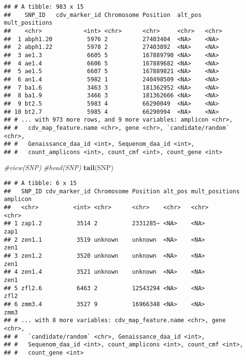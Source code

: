 \documentclass[]{article}
\newenvironment{Shaded}{\begin{snugshade}}{\end{snugshade}}
\newcommand{\KeywordTok}[1]{\textcolor[rgb]{0.13,0.29,0.53}{\textbf{#1}}}
\newcommand{\CommentTok}[1]{\textcolor[rgb]{0.56,0.35,0.01}{\textit{#1}}}
\newcommand{\NormalTok}[1]{#1}
\begin{document}
\begin{verbatim}
## # A tibble: 983 x 15
##    SNP_ID   cdv_marker_id Chromosome Position  alt_pos mult_positions
##    <chr>            <int> <chr>      <chr>     <chr>   <chr>         
##  1 abph1.20          5976 2          27403404  <NA>    <NA>          
##  2 abph1.22          5978 2          27403892  <NA>    <NA>          
##  3 ae1.3             6605 5          167889790 <NA>    <NA>          
##  4 ae1.4             6606 5          167889682 <NA>    <NA>          
##  5 ae1.5             6607 5          167889821 <NA>    <NA>          
##  6 an1.4             5982 1          240498509 <NA>    <NA>          
##  7 ba1.6             3463 3          181362952 <NA>    <NA>          
##  8 ba1.9             3466 3          181362666 <NA>    <NA>          
##  9 bt2.5             5983 4          66290049  <NA>    <NA>          
## 10 bt2.7             5985 4          66290994  <NA>    <NA>          
## # ... with 973 more rows, and 9 more variables: amplicon <chr>,
## #   cdv_map_feature.name <chr>, gene <chr>, `candidate/random` <chr>,
## #   Genaissance_daa_id <int>, Sequenom_daa_id <int>,
## #   count_amplicons <int>, count_cmf <int>, count_gene <int>
\end{verbatim}

\begin{Shaded}
\begin{Highlighting}[]
\CommentTok{#view(SNP)}
\CommentTok{#head(SNP)}
\KeywordTok{tail}\NormalTok{(SNP)}
\end{Highlighting}
\end{Shaded}

\begin{verbatim}
## # A tibble: 6 x 15
##   SNP_ID cdv_marker_id Chromosome Position alt_pos mult_positions amplicon
##   <chr>          <int> <chr>      <chr>    <chr>   <chr>          <chr>   
## 1 zap1.2          3514 2          2331285~ <NA>    <NA>           zap1    
## 2 zen1.1          3519 unknown    unknown  <NA>    <NA>           zen1    
## 3 zen1.2          3520 unknown    unknown  <NA>    <NA>           zen1    
## 4 zen1.4          3521 unknown    unknown  <NA>    <NA>           zen1    
## 5 zfl2.6          6463 2          12543294 <NA>    <NA>           zfl2    
## 6 zmm3.4          3527 9          16966348 <NA>    <NA>           zmm3    
## # ... with 8 more variables: cdv_map_feature.name <chr>, gene <chr>,
## #   `candidate/random` <chr>, Genaissance_daa_id <int>,
## #   Sequenom_daa_id <int>, count_amplicons <int>, count_cmf <int>,
## #   count_gene <int>
\end{verbatim}
\end{document}
